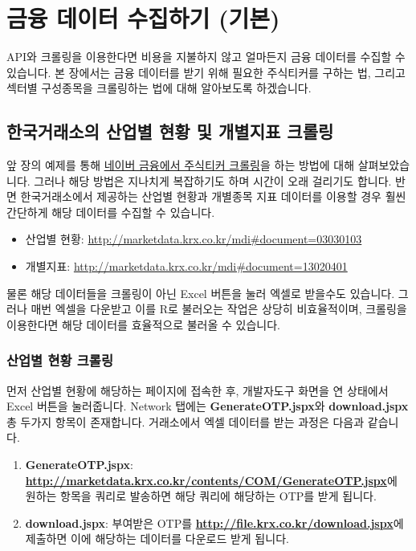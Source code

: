 \documentclass[]{book}
\providecommand{\tightlist}{%
  \setlength{\itemsep}{0pt}\setlength{\parskip}{0pt}}
\begin{document}
\hypertarget{section-17}{%
\chapter{금융 데이터 수집하기 (기본)}\label{section-17}}

API와 크롤링을 이용한다면 비용을 지불하지 않고 얼마든지 금융 데이터를 수집할 수 있습니다. 본 장에서는 금융 데이터를 받기 위해 필요한 주식티커를 구하는 법, 그리고 섹터별 구성종목을 크롤링하는 법에 대해 알아보도록 하겠습니다.

\hypertarget{section-18}{%
\section{한국거래소의 산업별 현황 및 개별지표 크롤링}\label{section-18}}

앞 장의 예제를 통해 \protect\hyperlink{section-16}{네이버 금융에서 주식티커 크롤링}을 하는 방법에 대해 살펴보았습니다. 그러나 해당 방법은 지나치게 복잡하기도 하며 시간이 오래 걸리기도 합니다. 반면 한국거래소에서 제공하는 산업별 현황과 개별종목 지표 데이터를 이용할 경우 훨씬 간단하게 해당 데이터를 수집할 수 있습니다.

\begin{itemize}
\tightlist
\item
  산업별 현황: \url{http://marketdata.krx.co.kr/mdi\#document=03030103}
\item
  개별지표: \url{http://marketdata.krx.co.kr/mdi\#document=13020401}
\end{itemize}

물론 해당 데이터들을 크롤링이 아닌 Excel 버튼을 눌러 엑셀로 받을수도 있습니다. 그러나 매번 엑셀을 다운받고 이를 R로 불러오는 작업은 상당히 비효율적이며, 크롤링을 이용한다면 해당 데이터를 효율적으로 불러올 수 있습니다.

\hypertarget{section-19}{%
\subsection{산업별 현황 크롤링}\label{section-19}}

먼저 산업별 현황에 해당하는 페이지에 접속한 후, 개발자도구 화면을 연 상태에서 Excel 버튼을 눌러줍니다. Network 탭에는 \textbf{GenerateOTP.jspx}와 \textbf{download.jspx} 총 두가지 항목이 존재합니다. 거래소에서 엑셀 데이터를 받는 과정은 다음과 같습니다.

\begin{enumerate}
\def\labelenumi{\arabic{enumi}.}
\item
  \textbf{GenerateOTP.jspx}: \textbf{\url{http://marketdata.krx.co.kr/contents/COM/GenerateOTP.jspx}}에 원하는 항목을 쿼리로 발송하면 해당 쿼리에 해당하는 OTP를 받게 됩니다.
\item
  \textbf{download.jspx}: 부여받은 OTP를 \textbf{\url{http://file.krx.co.kr/download.jspx}}에 제출하면 이에 해당하는 데이터를 다운로드 받게 됩니다.
\end{enumerate}
\end{document}
